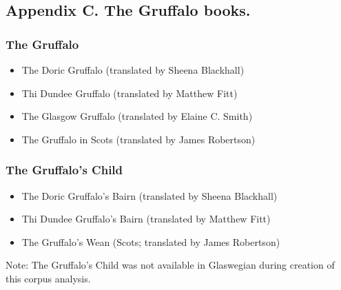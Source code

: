 \documentclass[doc,floatsintext]{apa6}
\providecommand{\tightlist}{%
  \setlength{\itemsep}{0pt}\setlength{\parskip}{0pt}}
\begin{document}
\clearpage



\begin{appendix}
\section{}
\subsection{Appendix C. The Gruffalo books.}\label{appendix-b}

\subsubsection{The Gruffalo}\label{the-gruffalo}

\begin{itemize}
\tightlist
\item
  The Doric Gruffalo (translated by Sheena Blackhall)
\item
  Thi Dundee Gruffalo (translated by Matthew Fitt)
\item
  The Glasgow Gruffalo (translated by Elaine C. Smith)
\item
  The Gruffalo in Scots (translated by James Robertson)
\end{itemize}

\subsubsection{The Gruffalo's Child}\label{the-gruffalos-child}

\begin{itemize}
\tightlist
\item
  The Doric Gruffalo's Bairn (translated by Sheena Blackhall)
\item
  Thi Dundee Gruffalo's Bairn (translated by Matthew Fitt)
\item
  The Gruffalo's Wean (Scots; translated by James Robertson)
\end{itemize}

Note: The Gruffalo's Child was not available in Glaswegian during
creation of this corpus analysis.
\end{appendix}

\clearpage
\end{document}
